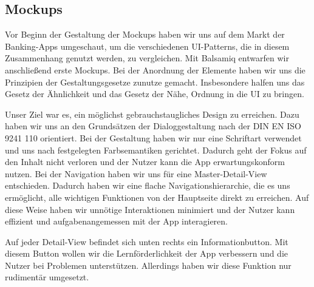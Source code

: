 
\subsection{Mockups}
	Vor Beginn der Gestaltung der Mockups haben wir uns auf dem Markt der Banking-Apps umgeschaut, um die verschiedenen UI-Patterns, die in diesem Zusammenhang genutzt werden, zu vergleichen. Mit Balsamiq entwarfen wir anschließend erste Mockups. Bei der Anordnung der Elemente haben wir uns die Prinzipien der Gestaltungsgesetze zunutze gemacht. Insbesondere halfen uns das Gesetz der Ähnlichkeit und das Gesetz der Nähe, Ordnung in die UI zu bringen. 

	Unser Ziel war es, ein möglichst gebrauchstaugliches Design zu erreichen. Dazu haben wir uns an den Grundsätzen der Dialoggestaltung nach der DIN EN ISO 9241 110 orientiert. Bei der Gestaltung haben wir nur eine Schriftart verwendet und uns nach festgelegten Farbsemantiken gerichtet. Dadurch geht der Fokus auf den Inhalt nicht verloren und der Nutzer kann die App erwartungskonform nutzen. Bei der Navigation haben wir uns für eine Master-Detail-View entschieden. Dadurch haben wir eine flache Navigationshierarchie, die es uns ermöglicht, alle wichtigen Funktionen von der Hauptseite direkt zu erreichen. Auf diese Weise haben wir unnötige Interaktionen minimiert und der Nutzer kann effizient und aufgabenangemessen mit der App interagieren.  

	Auf jeder Detail-View befindet sich unten rechts ein Informationbutton. Mit diesem Button wollen wir die Lernförderlichkeit der App verbessern und die Nutzer bei Problemen unterstützen. Allerdings haben wir diese Funktion nur rudimentär umgesetzt.
	
